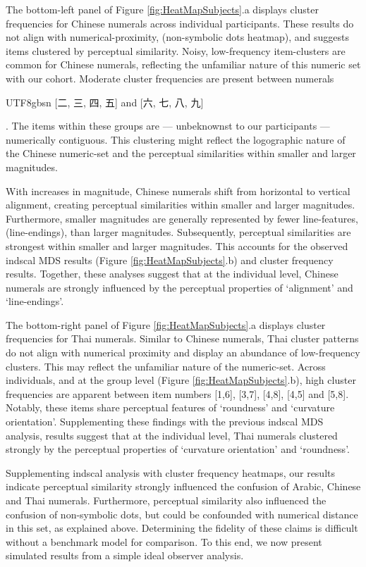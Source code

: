 The bottom-left panel of Figure \ref{fig:HeatMapSubjects}.a displays cluster frequencies for Chinese numerals across individual participants. These results do not align with numerical-proximity, (\eg non-symbolic dots heatmap), and suggests items clustered by perceptual similarity. Noisy, low-frequency item-clusters are common for Chinese numerals, reflecting the unfamiliar nature of this numeric set with our cohort. Moderate cluster frequencies are present between numerals \begin{CJK}{UTF8}{gbsn} [二, 三, 四, 五] and [六, 七, 八, 九]\end{CJK}. The items within these groups are --- unbeknownst to our participants --- numerically contiguous. This clustering might reflect the logographic nature of the Chinese numeric-set and the perceptual similarities within smaller and larger magnitudes. 

With increases in magnitude, Chinese numerals shift from horizontal to vertical alignment, creating perceptual similarities within smaller and larger magnitudes. Furthermore, smaller magnitudes are generally represented by fewer line-features, (\ie line-endings), than larger magnitudes. Subsequently, perceptual similarities are strongest within smaller and larger magnitudes. This accounts for the observed indscal MDS results (Figure \ref{fig:HeatMapSubjects}.b) and cluster frequency results. Together, these analyses suggest that at the individual level, Chinese numerals are strongly influenced by the perceptual properties of `alignment' and `line-endings'. 

The bottom-right panel of Figure \ref{fig:HeatMapSubjects}.a displays cluster frequencies for Thai numerals. Similar to Chinese numerals, Thai cluster patterns do not align with numerical proximity and display an abundance of low-frequency clusters. This may reflect the unfamiliar nature of the numeric-set. Across individuals, and at the group level (Figure \ref{fig:HeatMapSubjects}.b), high cluster frequencies are apparent between item numbers [1,6], [3,7], [4,8], [4,5] and [5,8]. Notably, these items share perceptual features of `roundness' and `curvature orientation'. Supplementing these findings with the previous indscal MDS analysis, results suggest that at the individual level, Thai numerals clustered strongly by the perceptual properties of `curvature orientation' and `roundness'. 

Supplementing indscal analysis with cluster frequency heatmaps, our results indicate perceptual similarity strongly influenced the confusion of Arabic, Chinese and Thai numerals. Furthermore, perceptual similarity also influenced the confusion of non-symbolic dots, but could be confounded with numerical distance in this set, as explained above. Determining the fidelity of these claims is difficult without a benchmark model for comparison. To this end, we now present simulated results from a simple ideal observer analysis. 

